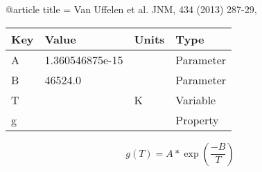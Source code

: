 @article{
title = {Van Uffelen et al. JNM, 434 (2013) 287-29},
}

\begin{tabular}{|l|l|l|l|}
    \hline
    Key & Value & Units & Type \\
    \hline
    A & 1.360546875e-15 &  & Parameter\\
    B & 46524.0 &  & Parameter \\
    T &   & K    & Variable\\
    g &   &  & Property\\
    \hline
\end{tabular}

\begin{equation}
g(T)=A*\exp(\frac{-B}{T})
\end{equation}

